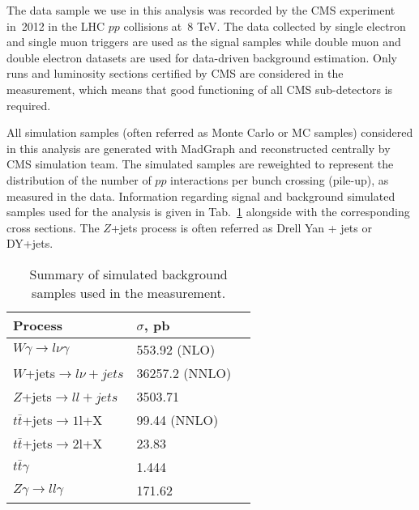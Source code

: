The data sample we use in this analysis was recorded by the CMS experiment in~2012 in the LHC $pp$ collisions at~8 TeV. The data collected by single electron and single muon triggers are used as the signal samples while double muon and double electron datasets are used for data-driven background estimation. Only runs and luminosity sections certified by CMS are considered in the measurement, which means that good functioning of all CMS sub-detectors is required.

All simulation samples (often referred as Monte Carlo or MC samples) considered in this analysis are generated with MadGraph and reconstructed centrally by CMS simulation team. The simulated samples are reweighted to represent the distribution of the number of $pp$ interactions per bunch crossing (pile-up), as measured in the data. Information regarding signal and background simulated samples used for the analysis is given in Tab.~\ref{tab:mc_bkg_samples} alongside with the corresponding cross sections. The $Z$+jets process is often referred as Drell Yan + jets or DY+jets.

\begin{table}[h]
  \small
  \begin{center}
    \caption{Summary of simulated background samples used in the measurement.}
    \begin{tabular}{|l|l|l|}
      \hline
      Process                      & $\sigma$, pb         \\ \hline
      $W\gamma \rightarrow l\nu\gamma$     & 553.92 (NLO)    \\ \hline
      $W$+jets$ \rightarrow l\nu + jets$          & 36257.2 (NNLO)  \\  \hline
      $Z$+jets$ \rightarrow ll + jets$            & 3503.71         \\ \hline
      $t\bar{t}$+jets$\rightarrow 1$l+X         & 99.44 (NNLO)   \\ \hline
      $t\bar{t}$+jets$\rightarrow 2$l+X         & 23.83         \\ \hline
      $t\bar{t}\gamma$                    & 1.444          \\ \hline
      $Z\gamma \rightarrow ll\gamma$       & 171.62           \\ \hline
    \end{tabular}
    \label{tab:mc_bkg_samples}
  \end{center}
\end{table} 

